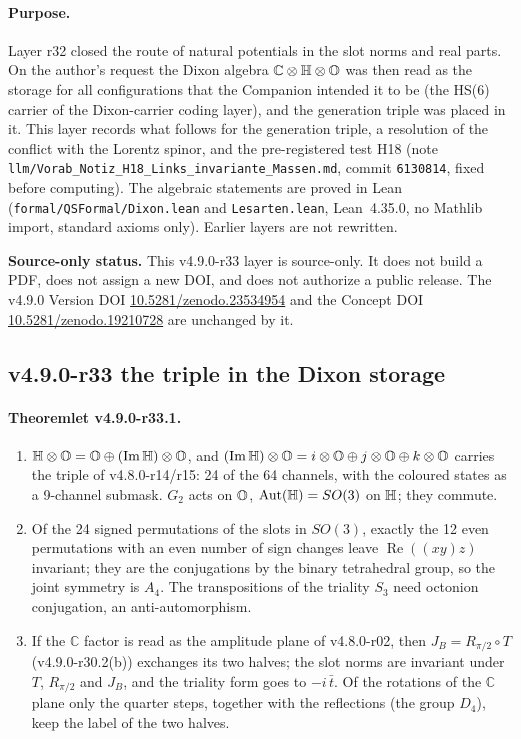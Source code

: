 \paragraph{Purpose.}
Layer r32 closed the route of natural potentials in the slot norms and real parts.  On the author's request the Dixon
algebra \(\mathbb C\otimes\mathbb{H}\otimes\mathbb{O}\) was then read as the storage for all configurations that the Companion intended
it to be (the HS(6) carrier of the Dixon-carrier coding layer), and the generation triple was placed in it.  This layer
records what follows for the generation triple, a resolution of the conflict with the Lorentz spinor, and the
pre-registered test H18 (note \texttt{llm/Vorab\_Notiz\_H18\_Links\_invariante\_Massen.md}, commit \texttt{6130814}, fixed
before computing).  The algebraic statements are proved in Lean (\texttt{formal/QSFormal/Dixon.lean} and
\texttt{Lesarten.lean}, Lean~4.35.0, no Mathlib import, standard axioms only).  Earlier layers are not rewritten.

\noindent\textbf{Source-only status.}
This v4.9.0-r33 layer is source-only.  It does not build a PDF, does not assign a new DOI,
and does not authorize a public release.  The v4.9.0 Version DOI
\href{https://doi.org/10.5281/zenodo.23534954}{10.5281/zenodo.23534954} and the Concept DOI
\href{https://doi.org/10.5281/zenodo.19210728}{10.5281/zenodo.19210728} are unchanged by it.

\subsection*{v4.9.0-r33 the triple in the Dixon storage}
\label{subsec:v490-r33-storage}

\paragraph{Theoremlet v4.9.0-r33.1.}
\begin{enumerate}[leftmargin=2em]
\item[(a)] \(\mathbb{H}\otimes\mathbb{O}=\mathbb{O}\oplus(\operatorname{Im}\mathbb{H})\otimes\mathbb{O}\), and \((\operatorname{Im}\mathbb{H})\otimes\mathbb{O}=i\otimes\mathbb{O}\oplus
j\otimes\mathbb{O}\oplus k\otimes\mathbb{O}\) carries the triple of v4.8.0-r14/r15: 24 of the 64 channels, with the coloured states as a
9-channel submask.  \(G_2\) acts on \(\mathbb{O}\), \(\operatorname{Aut}(\mathbb{H})=SO(3)\) on \(\mathbb{H}\); they commute.
\item[(b)] Of the 24 signed permutations of the slots in \(SO(3)\), exactly the 12 even permutations with an even number of
sign changes leave \(\operatorname{Re}((xy)z)\) invariant; they are the conjugations by the binary tetrahedral group, so
the joint symmetry is \(A_4\).  The transpositions of the triality \(S_3\) need octonion conjugation, an anti-automorphism.
\item[(c)] If the \(\mathbb C\) factor is read as the amplitude plane of v4.8.0-r02, then \(J_B=R_{\pi/2}\circ T\) (v4.9.0-r30.2(b))
exchanges its two halves; the slot norms are invariant under \(T\), \(R_{\pi/2}\) and \(J_B\), and the triality form goes to
\(-i\,\bar t\).  Of the rotations of the \(\mathbb C\) plane only the quarter steps, together with the reflections (the
group \(D_4\)), keep the label of the two halves.
\end{enumerate}

